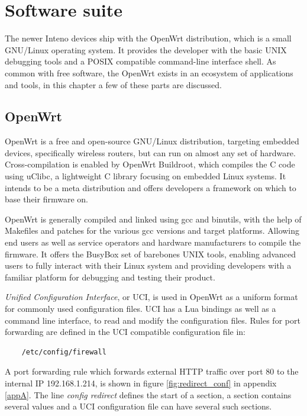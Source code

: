 \documentclass[a4paper,11pt,makeidx]{kth-bcs}
\begin{document}
\section{Software suite}

The newer Inteno devices ship with the OpenWrt distribution, which is a small GNU/Linux operating system.
It provides the developer with the basic UNIX debugging tools and a POSIX compatible command-line interface shell.
As common with free software, the OpenWrt exists in an ecosystem of applications and tools, in this chapter a few of these parts are discussed.

\subsection{OpenWrt}
OpenWrt is a free and open-source GNU/Linux distribution, targeting embedded devices, specifically wireless routers, but can run on almost any set of hardware.
Cross-compilation is enabled by OpenWrt Buildroot, which compiles the C code using uClibc, a lightweight C library focusing on embedded Linux systems. 
It intends to be a meta distribution and offers developers a framework on which to base their firmware on.

OpenWrt is generally compiled and linked using gcc and binutils, with the help of Makefiles and patches for the various gcc versions and target platforms.
Allowing end users as well as service operators and hardware manufacturers to compile the firmware.
It offers the BusyBox set of barebones UNIX tools, enabling advanced users to fully interact with their Linux system and providing developers with a familiar platform for debugging and testing their product.\cite{OpenWrt:structure_design}

\emph{Unified Configuration Interface}, or UCI, is used in OpenWrt as a uniform format for commonly used configuration files.
UCI has a Lua bindings as well as a command line interface, to read and modify the configuration files.
Rules for port forwarding are defined in the UCI compatible configuration file in:
\begin{verbatim}
    /etc/config/firewall
\end{verbatim}

A port forwarding rule which forwards external HTTP traffic over port 80 to the internal IP 192.168.1.214, is shown in figure \ref{fig:redirect_conf} in appendix \ref{appA}.
The line \emph{config redirect} defines the start of a section, a section contains several values and a UCI configuration file can have several such sections.
\end{document}
